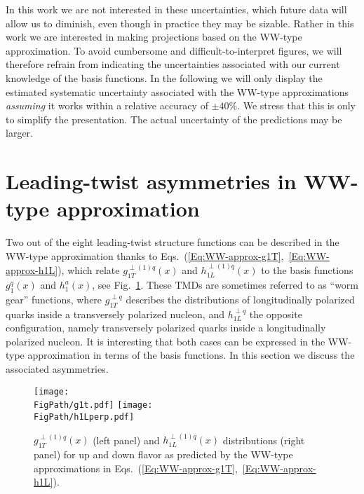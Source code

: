 \documentclass[a4paper,11pt]{article}
\newcommand*{\FigPath}{./figs}%
\begin{document}
In this work we are not interested in these uncertainties, which
future data will allow us to diminish, even though in practice
they may be sizable. Rather in this work we are interested in
making projections based on the WW-type approximation. To avoid
cumbersome and difficult-to-interpret figures, we will therefore
refrain from indicating the uncertainties associated with our
current knowledge of the basis functions. In the following
we will only display the estimated systematic uncertainty
associated with the WW-type approximations {\it assuming}
it works within a relative accuracy of $\pm40\%$.
We stress that this is only to simplify the presentation. The
actual uncertainty of the predictions may be larger.



\section{Leading-twist asymmetries in WW-type approximation}
\label{Sec-6:twist-2-and-WW}

Two out of the eight leading-twist structure functions
can be described in the WW-type approximation thanks to
Eqs.~(\ref{Eq:WW-approx-g1T},~\ref{Eq:WW-approx-h1L}), which
relate $g_{1T}^{\perp (1) q}(x)$ and $h_{1L}^{\perp (1) q}(x)$ to the
basis functions $g_1^q(x)$ and $h_1^a(x)$, see Fig.~\ref{g1t_h1l_functions}.
These TMDs are sometimes referred to as ``worm gear'' functions, where
$g_{1T}^{\perp q}$ describes the distributions of longitudinally
polarized quarks inside a transversely polarized nucleon,
and $h_{1L}^{\perp q}$ the opposite configuration, namely transversely
polarized quarks inside a longitudinally polarized nucleon.
It is interesting that both cases can be expressed in the
WW-type approximation in terms of the basis functions.
In this section we discuss the associated asymmetries.

\begin{figure}[b!]
\centering
\texttt{[image: \\FigPath/g1t.pdf]} \quad
\texttt{[image: \\FigPath/h1Lperp.pdf]}
	\caption{\label{g1t_h1l_functions}
	$g^{\perp (1) q}_{1T}(x)$ (left panel) and
	$h^{\perp (1) q}_{1L}(x)$ distributions (right panel)
	for up and down flavor
	as predicted by the WW-type approximations in
	Eqs.~(\ref{Eq:WW-approx-g1T},~\ref{Eq:WW-approx-h1L}).}
\end{figure}
\end{document}
